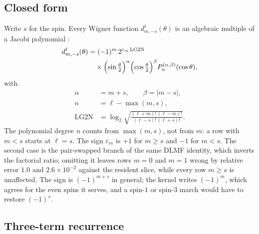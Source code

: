 \documentclass[usenatbib,useAMS]{mnras}
\begin{document}
\subsection{Closed form}

Write $s$ for the spin. Every Wigner function $d^\ell_{m,-s}(\theta)$ is an algebraic multiple of a Jacobi polynomial \citep[NIST DLMF 14.9.16, 18.3]{olver2010}:
\begin{equation}
\label{eq:wigner-jacobi}
\begin{split}
  d^\ell_{m,-s}(\theta)
  &= (-1)^m\,2^{\varepsilon_m\,\mathrm{LG2N}}\\
  &\quad\times
    \Bigl(\sin\tfrac{\theta}{2}\Bigr)^\alpha
    \Bigl(\cos\tfrac{\theta}{2}\Bigr)^\beta
    P_n^{(\alpha,\beta)}(\cos\theta),
\end{split}
\end{equation}
with
\begin{equation}
\begin{split}
  \alpha&=m+s,\qquad
  \beta=\lvert m-s\rvert,\\
  n&=\ell-\max(m,s),\\
  \mathrm{LG2N}
  &=\log_2\sqrt{\frac{(\ell+m)!\,(\ell-m)!}{(\ell-s)!\,(\ell+s)!}}.
\end{split}
\end{equation}
The polynomial degree $n$ counts from $\max(m,s)$, not from $m$: a row with $m<s$ starts at $\ell=s$. The sign $\varepsilon_m$ is $+1$ for $m\ge s$ and $-1$ for $m<s$. The second case is the pair-swapped branch of the same DLMF identity, which inverts the factorial ratio; omitting it leaves rows $m=0$ and $m=1$ wrong by relative error $1.0$ and $2.6\times10^{-2}$ against the resident slice, while every row $m\ge s$ is unaffected. The sign is $(-1)^{m+s}$ in general; the kernel writes $(-1)^m$, which agrees for the even spins it serves, and a spin-$1$ or spin-$3$ march would have to restore $(-1)^s$.

\subsection{Three-term recurrence}
\end{document}
